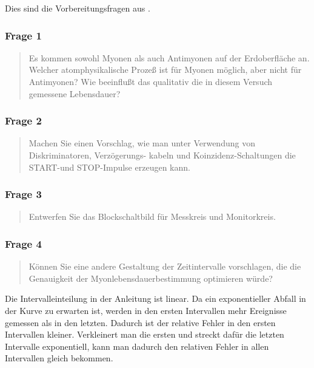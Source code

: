 \documentclass[11pt, ngerman, fleqn, DIV=15, headinclude, BCOR=2cm]{scrreprt}
\begin{document}
Dies sind die Vorbereitungsfragen aus \parencite[14]{physik512-Anleitung}.

\subsubsection{Frage 1}

\begin{quote}
    Es kommen sowohl Myonen als auch Antimyonen auf der Erdoberfläche an.
    Welcher atomphysikalische Prozeß ist für Myonen möglich, aber nicht für
    Antimyonen? Wie beeinflußt das qualitativ die in diesem Versuch gemessene
    Lebensdauer?
\end{quote}


\subsubsection{Frage 2}

\begin{quote}
    Machen Sie einen Vorschlag, wie man unter Verwendung von Diskriminatoren,
    Verzögerungs- kabeln und Koinzidenz-Schaltungen die START-und STOP-Impulse
    erzeugen kann.
\end{quote}


\subsubsection{Frage 3}

\begin{quote}
    Entwerfen Sie das Blockschaltbild für Messkreis und Monitorkreis.
\end{quote}


\subsubsection{Frage 4}

\begin{quote}
    Können Sie eine andere Gestaltung der Zeitintervalle vorschlagen, die die
    Genauigkeit der Myonlebensdauerbestimmung optimieren würde?
\end{quote}

Die Intervalleinteilung in der Anleitung ist linear. Da ein exponentieller
Abfall in der Kurve zu erwarten ist, werden in den ersten Intervallen mehr
Ereignisse gemessen als in den letzten. Dadurch ist der relative Fehler in den
ersten Intervallen kleiner. Verkleinert man die ersten und streckt dafür die
letzten Intervalle exponentiell, kann man dadurch den relativen Fehler in allen
Intervallen gleich bekommen.
\end{document}
